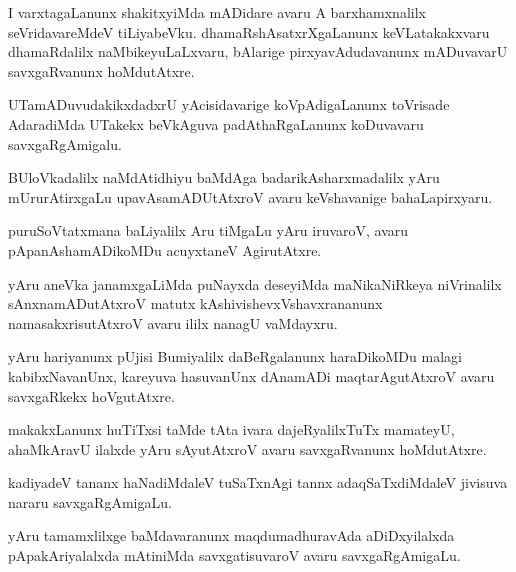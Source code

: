 \documentclass{article}
\begin{document}
\begin{mn}%
I varxtagaLanunx shakitxyiMda mADidare avaru A barxhamxnalilx seVridavareMdeV tiLiyabeVku. 
dhamaRshAsatxrXgaLanunx keVLatakakxvaru dhamaRdalilx naMbikeyuLaLxvaru, bAlarige 
pirxyavAdudavanunx mADuvavarU savxgaRvanunx hoMdutAtxre.
\end{mn}

\begin{mn}%
UTamADuvudakikxdadxrU yAcisidavarige koVpAdigaLanunx toVrisade AdaradiMda UTakekx 
beVkAguva padAthaRgaLanunx koDuvavaru savxgaRgAmigalu.
\end{mn}

\begin{mn}%
BUloVkadalilx naMdAtidhiyu baMdAga badarikAsharxmadalilx yAru mUrurAtirxgaLu 
upavAsamADUtAtxroV avaru keVshavanige bahaLapirxyaru.
\end{mn}

\begin{mn}%
puruSoVtatxmana baLiyalilx Aru tiMgaLu yAru iruvaroV, avaru pApanAshamADikoMDu acuyxtaneV 
AgirutAtxre.
\end{mn}

\begin{mn}%
yAru aneVka janamxgaLiMda puNayxda deseyiMda maNikaNiRkeya niVrinalilx sAnxnamADutAtxroV 
matutx kAshivishevxVshavxrananunx namasakxrisutAtxroV avaru ililx nanagU vaMdayxru.
\end{mn}

\begin{mn}%
yAru hariyanunx pUjisi Bumiyalilx daBeRgalanunx haraDikoMDu malagi kabibxNavanUnx, 
kareyuva hasuvanUnx dAnamADi maqtarAgutAtxroV avaru savxgaRkekx hoVgutAtxre.
\end{mn}

\begin{mn}%
makakxLanunx huTiTxsi taMde tAta ivara dajeRyalilxTuTx mamateyU, ahaMkAravU ilalxde yAru 
sAyutAtxroV avaru savxgaRvanunx hoMdutAtxre.
\end{mn}

\begin{mn}%
kadiyadeV tananx haNadiMdaleV tuSaTxnAgi tannx adaqSaTxdiMdaleV jivisuva nararu 
savxgaRgAmigaLu.
\end{mn}

\begin{mn}%
yAru tamamxlilxge baMdavaranunx maqdumadhuravAda aDiDxyilalxda pApakAriyalalxda mAtiniMda 
savxgatisuvaroV avaru savxgaRgAmigaLu.
\end{mn}
\end{document}
